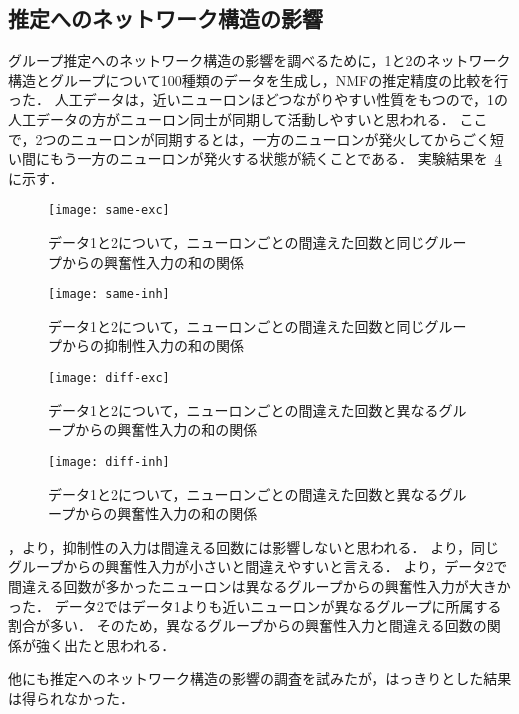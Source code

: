 \subsection{推定へのネットワーク構造の影響}
グループ推定へのネットワーク構造の影響を調べるために，1と2のネットワーク構造とグループについて100種類のデータを生成し，NMFの推定精度の比較を行った．
人工データは，近いニューロンほどつながりやすい性質をもつので，1の人工データの方がニューロン同士が同期して活動しやすいと思われる．
ここで，2つのニューロンが同期するとは，一方のニューロンが発火してからごく短い間にもう一方のニューロンが発火する状態が続くことである．
実験結果を~\ref{fig:diff-inh}に示す．
\begin{figure}[htbp]
    \begin{center}
        \texttt{[image: same-exc]}
        \caption{データ1と2について，ニューロンごとの間違えた回数と同じグループからの興奮性入力の和の関係}
        \label{fig:same-exc}
    \end{center}
\end{figure}
\begin{figure}[htbp]
    \begin{center}
      \texttt{[image: same-inh]}
        \caption{データ1と2について，ニューロンごとの間違えた回数と同じグループからの抑制性入力の和の関係}
        \label{fig:same-inh}
    \end{center}
\end{figure}
\begin{figure}[htbp]
    \begin{center}
        \texttt{[image: diff-exc]}
        \caption{データ1と2について，ニューロンごとの間違えた回数と異なるグループからの興奮性入力の和の関係}
        \label{fig:diff-exc}
    \end{center}
\end{figure}
\begin{figure}[htbp]
    \begin{center}
        \texttt{[image: diff-inh]}
        \caption{データ1と2について，ニューロンごとの間違えた回数と異なるグループからの興奮性入力の和の関係}
        \label{fig:diff-inh}
    \end{center}
\end{figure}
，より，抑制性の入力は間違える回数には影響しないと思われる．
より，同じグループからの興奮性入力が小さいと間違えやすいと言える．
より，データ2で間違える回数が多かったニューロンは異なるグループからの興奮性入力が大きかった．
データ2ではデータ1よりも近いニューロンが異なるグループに所属する割合が多い．
そのため，異なるグループからの興奮性入力と間違える回数の関係が強く出たと思われる．

他にも推定へのネットワーク構造の影響の調査を試みたが，はっきりとした結果は得られなかった．
